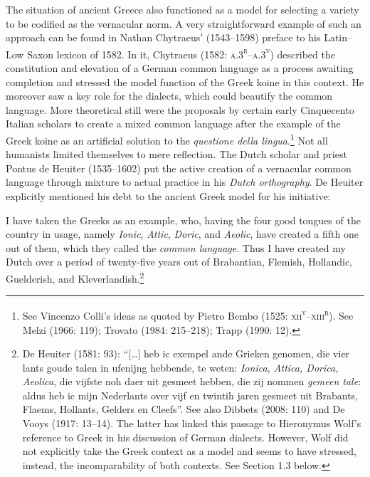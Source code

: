 \documentclass[12pt]{article}
\newenvironment{styleStandard}{\renewcommand\baselinestretch{1.25}\setlength\leftskip{0in}\setlength\rightskip{0in}\setlength\parindent{0.1972in}\setlength\parfillskip{0pt plus 1fil}\setlength\parskip{0in plus 1pt}\writerlistparindent\writerlistleftskip\leavevmode\normalfont\normalsize\writerlistlabel\ignorespaces}{\unskip\vspace{0in plus 1pt}\par}
\newenvironment{styleQuote}{\renewcommand\baselinestretch{1.25}\setlength\leftskip{0.3937in}\setlength\rightskip{0in}\setlength\parindent{0in}\setlength\parfillskip{0pt plus 1fil}\setlength\parskip{0.1665in plus 0.016649999in}\writerlistparindent\writerlistleftskip\leavevmode\normalfont\normalsize\writerlistlabel\ignorespaces}{\unskip\vspace{0.1665in plus 0.016649999in}\par}
\newcommand\writerlistleftskip{}
\newcommand\writerlistparindent{}
\newcommand\writerlistlabel{}
\begin{document}
\begin{styleStandard}
The situation of ancient Greece also functioned as a model for selecting a variety to be codified as the vernacular norm. A very straightforward example of such an approach can be found in Nathan Chytraeus’ (1543–1598) preface to his Latin–Low Saxon lexicon of 1582. In it, Chytraeus (1582: \textsc{a.3}\textsc{\textsuperscript{r}}\textsc{–a.3}\textsc{\textsuperscript{v}}) described the constitution and elevation of a German common language as a process awaiting completion and stressed the model function of the Greek koine in this context. He moreover saw a key role for the dialects, which could beautify the common language. More theoretical still were the proposals by certain early Cinquecento Italian scholars to create a mixed common language after the example of the Greek koine as an artificial solution to the \textit{questione della lingua}.\footnote{ See Vincenzo Colli’s ideas as quoted by Pietro Bembo (1525: \textsc{xii}\textsc{\textsuperscript{v}}\textsc{–xiii}\textsc{\textsuperscript{r}}). See Melzi (1966: 119); Trovato (1984: 215–218); Trapp (1990: 12).} Not all humanists limited themselves to mere reflection. The Dutch scholar and priest Pontus de Heuiter (1535–1602) put the active creation of a vernacular common language through mixture to actual practice in his \textit{Dutch orthography}. De Heuiter explicitly mentioned his debt to the ancient Greek model for his initiative:
\end{styleStandard}

\begin{styleQuote}
I have taken the Greeks as an example, who, having the four good tongues of the country in usage, namely \textit{Ionic}, \textit{Attic}, \textit{Doric}, and \textit{Aeolic}, have created a fifth one out of them, which they called the \textit{common language}. Thus I have created my Dutch over a period of twenty-five years out of Brabantian, Flemish, Hollandic, Guelderish, and Kleverlandish.\footnote{ De Heuiter (1581: 93): “[…] heb ic exempel ande Grieken genomen, die vier lants goude talen in ufenijng hebbende, te weten: \textit{Ionica, Attica, Dorica, Aeolica}, die vijfste noh daer uit gesmeet hebben, die zij nommen \textit{gemeen tale}: aldus heb ic mijn Nederlants over vijf en twintih jaren gesmeet uit Brabants, Flaems, Hollants, Gelders en Cleefs”. See also Dibbets (2008: 110) and De Vooys (1917: 13–14). The latter has linked this passage to Hieronymus Wolf’s reference to Greek in his discussion of German dialects. However, Wolf did not explicitly take the Greek context as a model and seems to have stressed, instead, the incomparability of both contexts. See Section 1.3 below.}
\end{styleQuote}
\end{document}
